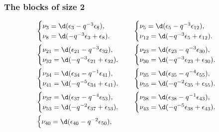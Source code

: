 \subsubsection{The blocks of size 2}

\begin{align*}
&\begin{cases}
\nu_{3} = \d(\epsilon_{3} - q^{-3}\epsilon_{8}),\\
\nu_{8} = \d(-q^{-3}\epsilon_{3} + \epsilon_{8}).
\end{cases}
&&\begin{cases}
\nu_{5} = \d(\epsilon_{5} - q^{-3}\epsilon_{12}),\\
\nu_{12} = \d(-q^{-3}\epsilon_{5} + \epsilon_{12}).
\end{cases}
\\
&\begin{cases}
\nu_{21} = \d(\epsilon_{21} - q^{-3}\epsilon_{32}),\\
\nu_{32} = \d(-q^{-3}\epsilon_{21} + \epsilon_{32}).
\end{cases}
&&\begin{cases}
\nu_{23} = \d(\epsilon_{23} - q^{-3}\epsilon_{30}),\\
\nu_{30} = \d(-q^{-3}\epsilon_{23} + \epsilon_{30}).
\end{cases}
\\
&\begin{cases}
\nu_{34} = \d(\epsilon_{34} - q^{-1}\epsilon_{41}),\\
\nu_{41} = \d(-q^{-5}\epsilon_{34} + \epsilon_{41}).
\end{cases}
&&\begin{cases}
\nu_{35} = \d(\epsilon_{35} - q^{-4}\epsilon_{55}),\\
\nu_{55} = \d(-q^{-2}\epsilon_{35} + \epsilon_{55}).
\end{cases}
\\
&\begin{cases}
\nu_{37} = \d(\epsilon_{37} - q^{-4}\epsilon_{53}),\\
\nu_{53} = \d(-q^{-2}\epsilon_{37} + \epsilon_{53}).
\end{cases}
&&\begin{cases}
\nu_{38} = \d(\epsilon_{38} - q^{-1}\epsilon_{43}),\\
\nu_{43} = \d(-q^{-5}\epsilon_{38} + \epsilon_{43}).
\end{cases}
\\
&\begin{cases}
\nu_{40} = \d(\epsilon_{40} - q^{-2}\epsilon_{50}),\\

\end{cases}
\end{align*}
